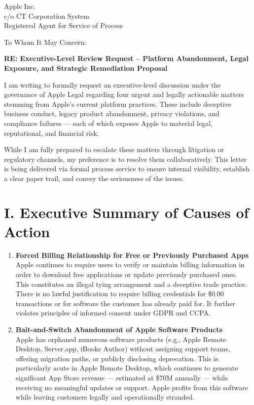 \documentclass[11pt]{letter}
\begin{document}
    \begin{letter}{Apple Inc.\\
    c/o CT Corporation System\\
    Registered Agent for Service of Process\\
    [Insert DE or CA Address Here]}

        \opening{To Whom It May Concern:}

        \textbf{RE: Executive-Level Review Request – Platform Abandonment, Legal Exposure, and Strategic Remediation Proposal}

        I am writing to formally request an executive-level discussion under the governance of Apple Legal regarding four urgent and legally actionable matters stemming from Apple’s current platform practices. These include deceptive business conduct, legacy product abandonment, privacy violations, and compliance failures — each of which exposes Apple to material legal, reputational, and financial risk.

        While I am fully prepared to escalate these matters through litigation or regulatory channels, my preference is to resolve them collaboratively. This letter is being delivered via formal process service to ensure internal visibility, establish a clear paper trail, and convey the seriousness of the issues.

        \section*{I. Executive Summary of Causes of Action}

        \begin{enumerate}
            \item \textbf{Forced Billing Relationship for Free or Previously Purchased Apps} \\
            Apple continues to require users to verify or maintain billing information in order to download free applications or update previously purchased ones. This constitutes an illegal tying arrangement and a deceptive trade practice. There is no lawful justification to require billing credentials for \$0.00 transactions or for software the customer has already paid for. It further violates principles of informed consent under GDPR and CCPA.

            \item \textbf{Bait-and-Switch Abandonment of Apple Software Products} \\
            Apple has orphaned numerous software products (e.g., Apple Remote Desktop, Server.app, iBooks Author) without assigning support teams, offering migration paths, or publicly disclosing deprecation. This is particularly acute in Apple Remote Desktop, which continues to generate significant App Store revenue — estimated at \$70M annually — while receiving no meaningful updates or support. Apple profits from this software while leaving customers legally and operationally stranded.


\end{enumerate}
\end{letter}
\end{document}
